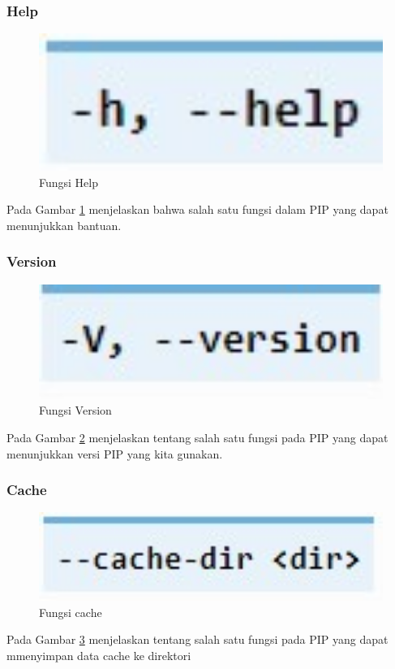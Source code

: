 \documentclass[12pt,a4paper]{article}
\begin{document}
\begin{itemize}
\subsubsection{Help}
\begin{figure}[h]
\begin{center}
\includegraphics[width=1\textwidth]{../figures/1help.jpg}
\caption{Fungsi Help}
\label{FungsiHelp}
\end{center}
\end{figure}
Pada Gambar \ref{FungsiHelp} menjelaskan bahwa salah satu fungsi dalam PIP yang dapat menunjukkan bantuan.
\subsubsection{Version}
\begin{figure}[h]
\begin{center}
\includegraphics[width=1\textwidth]{../figures/1versi.jpg} 
\caption{Fungsi Version}
\label{fungsiversi}
\end{center}
\end{figure}
Pada Gambar \ref{fungsiversi} menjelaskan tentang salah satu fungsi pada PIP yang dapat menunjukkan versi PIP yang kita gunakan.
\subsubsection{Cache}
\begin{figure}[h]
\begin{center}
\includegraphics[width=1\textwidth]{../figures/1cache.jpg} 
\caption{Fungsi cache}
\label{fungsicache}
\end{center}
\end{figure}
Pada Gambar \ref{fungsicache} menjelaskan tentang salah satu fungsi pada PIP yang dapat mmenyimpan data cache ke direktori %

\end{itemize}
\end{document}
